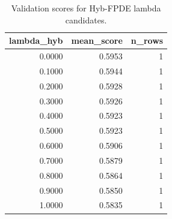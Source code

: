 \begin{table}[t]
\caption{Validation scores for Hyb-FPDE lambda candidates.}
\label{tab:lambda_distribution_computed}
\centering
\begin{tabular}{rrr}
\toprule
lambda\_hyb & mean\_score & n\_rows \\
\midrule
0.0000 & 0.5953 & 1 \\
0.1000 & 0.5944 & 1 \\
0.2000 & 0.5928 & 1 \\
0.3000 & 0.5926 & 1 \\
0.4000 & 0.5923 & 1 \\
0.5000 & 0.5923 & 1 \\
0.6000 & 0.5906 & 1 \\
0.7000 & 0.5879 & 1 \\
0.8000 & 0.5864 & 1 \\
0.9000 & 0.5850 & 1 \\
1.0000 & 0.5835 & 1 \\
\bottomrule
\end{tabular}

\end{table}
